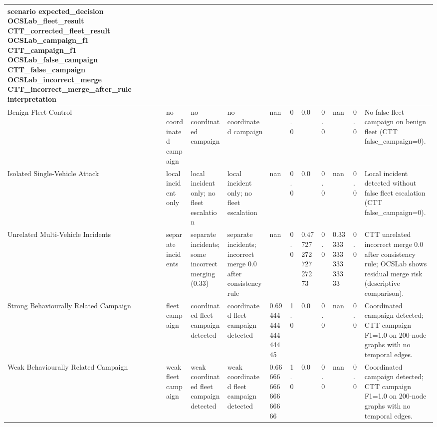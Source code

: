 \begin{tabular}{lllllllllll}
\hline
\textbf{scenario} \textbf{expected_decision} \textbf{OCSLab_fleet_result} \textbf{CTT_corrected_fleet_result} \textbf{OCSLab_campaign_f1} \textbf{CTT_campaign_f1} \textbf{OCSLab_false_campaign} \textbf{CTT_false_campaign} \textbf{OCSLab_incorrect_merge} \textbf{CTT_incorrect_merge_after_rule} \textbf{interpretation} \\
\hline
Benign-Fleet Control & no coordinated campaign & no coordinated campaign & no coordinated campaign & nan & 0.0 & 0.0 & 0.0 & nan & 0.0 & No false fleet campaign on benign fleet (CTT false\_campaign=0). \\
Isolated Single-Vehicle Attack & local incident only & local incident only; no fleet escalation & local incident only; no fleet escalation & nan & 0.0 & 0.0 & 0.0 & nan & 0.0 & Local incident detected without false fleet escalation (CTT false\_campaign=0). \\
Unrelated Multi-Vehicle Incidents & separate incidents & separate incidents; some incorrect merging (0.33) & separate incidents; incorrect merge 0.0 after consistency rule & nan & 0.0 & 0.4772727272727273 & 0.0 & 0.3333333333333333 & 0.0 & CTT unrelated incorrect merge 0.0 after consistency rule; OCSLab shows residual merge risk (descriptive comparison). \\
Strong Behaviourally Related Campaign & fleet campaign & coordinated fleet campaign detected & coordinated fleet campaign detected & 0.6944444444444445 & 1.0 & 0.0 & 0.0 & nan & 0.0 & Coordinated campaign detected; CTT campaign F1=1.0 on 200-node graphs with no temporal edges. \\
Weak Behaviourally Related Campaign & weak fleet campaign & weak coordinated fleet campaign detected & weak coordinated fleet campaign detected & 0.6666666666666666 & 1.0 & 0.0 & 0.0 & nan & 0.0 & Coordinated campaign detected; CTT campaign F1=1.0 on 200-node graphs with no temporal edges. \\
\hline
\end{tabular}
